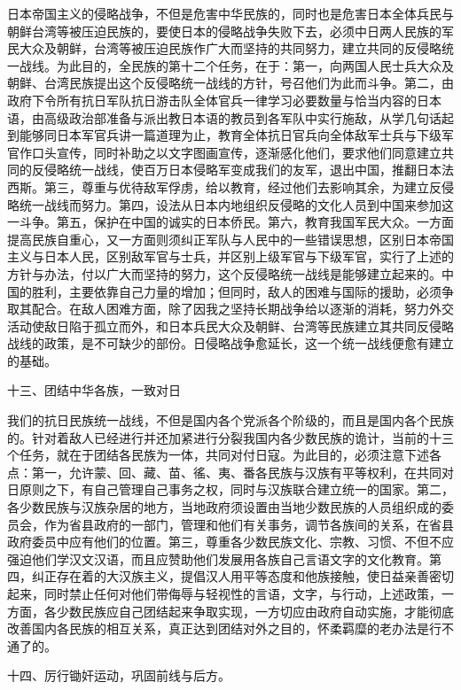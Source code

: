 日本帝国主义的侵略战争，不但是危害中华民族的，同时也是危害日本全体兵民与朝鲜台湾等被压迫民族的，要使日本的侵略战争失败下去，必须中日两人民族的军民大众及朝鲜，台湾等被压迫民族作广大而坚持的共同努力，建立共同的反侵略统一战线。为此目的，全民族的第十二个任务，在于：第一，向两国人民士兵大众及朝鲜、台湾民族提出这个反侵略统一战线的方针，号召他们为此而斗争。第二，由政府下令所有抗日军队抗日游击队全体官兵一律学习必要数量与恰当内容的日本语，由高级政治部准备与派出教日本语的教员到各军队中实行施敌，从学几句话起到能够同日本军官兵讲一篇道理为止，教育全体抗日官兵向全体敌军士兵与下级军官作口头宣传，同时补助之以文字图画宣传，逐渐感化他们，要求他们同意建立共同的反侵略统一战线，使百万日本侵略军变成我们的友军，退出中国，推翻日本法西斯。第三，尊重与优待敌军俘虏，给以教育，经过他们去影响其余，为建立反侵略统一战线而努力。第四，设法从日本内地组织反侵略的文化人员到中国来参加这一斗争。第五，保护在中国的诚实的日本侨民。第六，教育我国军民大众。一方面提高民族自重心，又一方面则须纠正军队与人民中的一些错误思想，区别日本帝国主义与日本人民，区别敌军官与士兵，并区别上级军官与下级军官，实行了上述的方针与办法，付以广大而坚持的努力，这个反侵略统一战线是能够建立起来的。中国的胜利，主要依靠自己力量的增加；但同时，敌人的困难与国际的援助，必须争取其配合。在敌人困难方面，除了因我之坚持长期战争给以逐渐的消耗，努力外交活动使敌日陷于孤立而外，和日本兵民大众及朝鲜、台湾等民族建立其共同反侵略战线的政策，是不可缺少的部份。日侵略战争愈延长，这一个统一战线便愈有建立的基础。


十三、团结中华各族，一致对日


我们的抗日民族统一战线，不但是国内各个党派各个阶级的，而且是国内各个民族的。针对着敌人已经进行并还加紧进行分裂我国内各少数民族的诡计，当前的十三个任务，就在于团结各民族为一体，共同对付日寇。为此目的，必须注意下述各点：第一，允许蒙、回、藏、苗、徭、夷、番各民族与汉族有平等权利，在共同对日原则之下，有自己管理自己事务之权，同时与汉族联合建立统一的国家。第二，各少数民族与汉族杂居的地方，当地政府须设置由当地少数民族的人员组织成的委员会，作为省县政府的一部门，管理和他们有关事务，调节各族间的关系，在省县政府委员中应有他们的位置。第三，尊重各少数民族文化、宗教、习惯、不但不应强迫他们学汉文汉语，而且应赞助他们发展用各族自己言语文字的文化教育。第四，纠正存在着的大汉族主义，提倡汉人用平等态度和他族接触，使日益亲善密切起来，同时禁止任何对他们带侮辱与轻视性的言语，文字，与行动，上述政策，一方面，各少数民族应自己团结起来争取实现，一方切应由政府自动实施，才能彻底改善国内各民族的相互关系，真正达到团结对外之目的，怀柔羁糜的老办法是行不通了的。

十四、厉行锄奸运动，巩固前线与后方。

